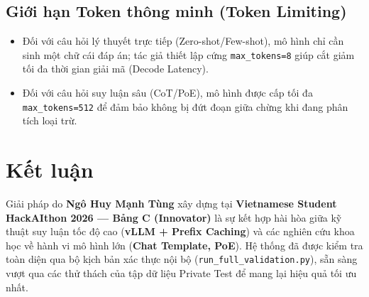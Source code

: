 \documentclass[12pt,a4paper]{article}
\begin{document}
\subsection{Giới hạn Token thông minh (Token Limiting)}

\begin{itemize}
    \item Đối với câu hỏi lý thuyết trực tiếp (Zero-shot/Few-shot),
          mô hình chỉ cần sinh một chữ cái đáp án; tác giả thiết lập cứng
          \texttt{max\_tokens=8} giúp cắt giảm tối đa thời gian giải mã
          (Decode Latency).
    \item Đối với câu hỏi suy luận sâu (CoT/PoE), mô hình được cấp
          tối đa \texttt{max\_tokens=512} để đảm bảo không bị đứt đoạn
          giữa chừng khi đang phân tích loại trừ.
\end{itemize}

\section{Kết luận}

Giải pháp do \textbf{Ngô Huy Mạnh Tùng} xây dựng tại
\textbf{Vietnamese Student HackAIthon 2026 --- Bảng C (Innovator)}
là sự kết hợp hài hòa giữa kỹ thuật suy luận tốc độ cao
(\textbf{vLLM + Prefix Caching}) và các nghiên cứu khoa học về hành vi
mô hình lớn (\textbf{Chat Template, PoE}).
Hệ thống đã được kiểm tra toàn diện qua bộ kịch bản xác thực nội bộ
(\texttt{run\_full\_validation.py}), sẵn sàng vượt qua các thử thách của
tập dữ liệu Private Test để mang lại hiệu quả tối ưu nhất.
\end{document}
